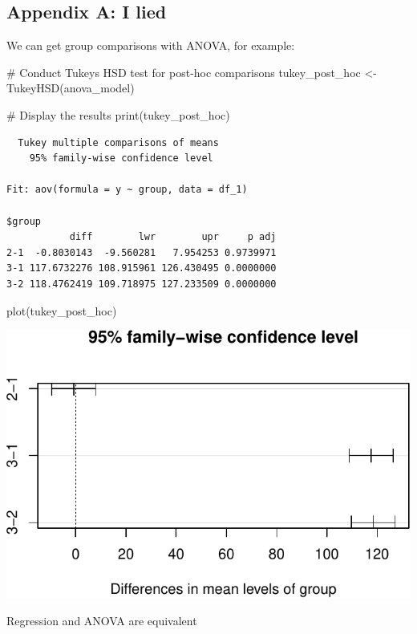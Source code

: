 \documentclass[
  singlecolumn]{article}
\newenvironment{Shaded}{}{}
\newcommand{\CommentTok}[1]{\textcolor[rgb]{0.42,0.45,0.49}{#1}}
\newcommand{\FunctionTok}[1]{\textcolor[rgb]{0.44,0.26,0.76}{#1}}
\newcommand{\NormalTok}[1]{\textcolor[rgb]{0.14,0.16,0.18}{#1}}
\newcommand{\OtherTok}[1]{\textcolor[rgb]{0.44,0.26,0.76}{#1}}
\theoremstyle{definition}
\theoremstyle{remark}
\begin{document}
\subsection{Appendix A: I lied}\label{appendix-a-i-lied}

We can get group comparisons with ANOVA, for example:

\begin{Shaded}
\begin{Highlighting}[]
\CommentTok{\# Conduct Tukey\textquotesingle{}s HSD test for post{-}hoc comparisons}
\NormalTok{tukey\_post\_hoc }\OtherTok{\textless{}{-}} \FunctionTok{TukeyHSD}\NormalTok{(anova\_model)}

\CommentTok{\# Display the results}
\FunctionTok{print}\NormalTok{(tukey\_post\_hoc)}
\end{Highlighting}
\end{Shaded}

\begin{verbatim}
  Tukey multiple comparisons of means
    95% family-wise confidence level

Fit: aov(formula = y ~ group, data = df_1)

$group
           diff        lwr        upr     p adj
2-1  -0.8030143  -9.560281   7.954253 0.9739971
3-1 117.6732276 108.915961 126.430495 0.0000000
3-2 118.4762419 109.718975 127.233509 0.0000000
\end{verbatim}

\begin{Shaded}
\begin{Highlighting}[]
\FunctionTok{plot}\NormalTok{(tukey\_post\_hoc)}
\end{Highlighting}
\end{Shaded}

\includegraphics{02-content_files/figure-pdf/unnamed-chunk-22-1.pdf}

Regression and ANOVA are equivalent
\end{document}
